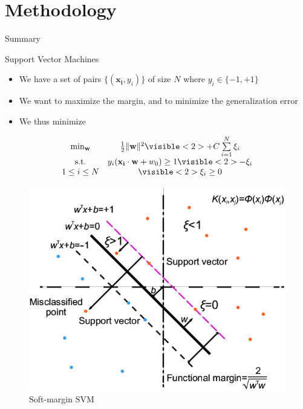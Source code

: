 \documentclass[compress]{beamer}
\DeclarePairedDelimiter{\norm}{\lVert}{\rVert}
\let\vec\mathbf
\begin{document}
\section{Methodology}
\begin{frame}{Summary}
  \tableofcontents[currentsection]
\end{frame}
\begin{frame}{Support Vector Machines}
\begin{multicols}{2}
	{\begin{itemize}
		\item We have a set of pairs $\{(\vec{x_i},y_i)\}$ of size $N$ where $y_i \in \{-1,+1\}$
		\item We want to maximize the margin, and to minimize the generalization error
		\item We thus minimize
	\end{itemize}
	\begin{equation*}
		\begin{matrix}
		\min_\vec{w} & \frac{1}{2}\norm{\vec{w}}^{2} \visible<2>{+ C\sum\limits_{i=1}^{N}\xi_i}\\
		\textup{s.t.} & y_{i}(\vec{x_i} \cdot \vec{w} + w_{0}) \geq 1\visible<2>{-\xi_i}\\
		1 \leq i \leq N & \visible<2>{\xi_i \geq 0} 
		\end{matrix}
	\end{equation*}}
	\begin{figure}
		\includegraphics[width=\linewidth]{data/softmargin.png}
		\caption*{Soft-margin SVM \citep{softmargin}}
	\end{figure}
\end{multicols}
\end{frame}
\end{document}
